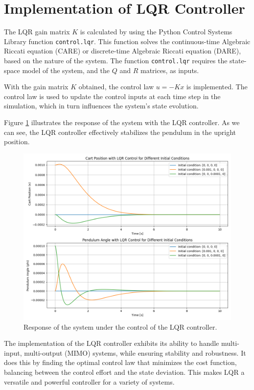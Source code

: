 \documentclass[11pt,twocolumn,twoside,lineno]{pnas-new}
\begin{document}
\section{Implementation of LQR Controller}

The LQR gain matrix $K$ is calculated by using the Python Control Systems Library function \texttt{control.lqr}. This function solves the continuous-time Algebraic Riccati equation (CARE) or discrete-time Algebraic Riccati equation (DARE), based on the nature of the system. The function \texttt{control.lqr} requires the state-space model of the system, and the $Q$ and $R$ matrices, as inputs.

With the gain matrix $K$ obtained, the control law $u = -Kx$ is implemented. The control law is used to update the control inputs at each time step in the simulation, which in turn influences the system's state evolution.

Figure \ref{fig:lqr_response} illustrates the response of the system with the LQR controller. As we can see, the LQR controller effectively stabilizes the pendulum in the upright position.

\begin{figure}[h]
\centering
\includegraphics[width=\linewidth]{simulations/lqr_response.png}
\caption{Response of the system under the control of the LQR controller.}
\label{fig:lqr_response}
\end{figure}

The implementation of the LQR controller exhibits its ability to handle multi-input, multi-output (MIMO) systems, while ensuring stability and robustness. It does this by finding the optimal control law that minimizes the cost function, balancing between the control effort and the state deviation. This makes LQR a versatile and powerful controller for a variety of systems.
\end{document}
